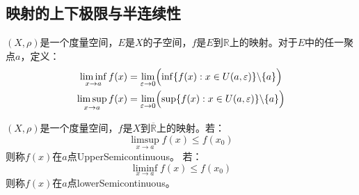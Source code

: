 \subsection{映射的上下极限与半连续性}
\begin{definition}
	$(X,\rho)$是一个度量空间，$E$是$X$的子空间，$f$是$E$到$\mathbb{R}$上的映射。对于$E$中的任一聚点$a$，定义：
	\begin{gather*}
		\liminf_{x\to a}f(x)=\lim_{\varepsilon\to0}\Bigl(\inf\{f(x):x\in U(a,\varepsilon)\}\backslash\{a\}\Bigr) \\
		\limsup_{x\to a}f(x)=\lim_{\varepsilon\to0}\Bigl(\sup\{f(x):x\in U(a,\varepsilon)\}\backslash\{a\}\Bigr)
	\end{gather*}
\end{definition}
\begin{definition}
	$(X,\rho)$是一个度量空间，$f$是$X$到$\overline{\mathbb{R}}$上的映射。若：
	\begin{equation*}
		\limsup_{x\to a}f(x)\leqslant f(x_0)
	\end{equation*}
	则称$f(x)$在$a$点\gls{UpperSemicontinuous}。
	若：
	\begin{equation*}
		\liminf_{x\to a}f(x)\leqslant f(x_0)
	\end{equation*}
	则称$f(x)$在$a$点\gls{lowerSemicontinuous}。
\end{definition}
